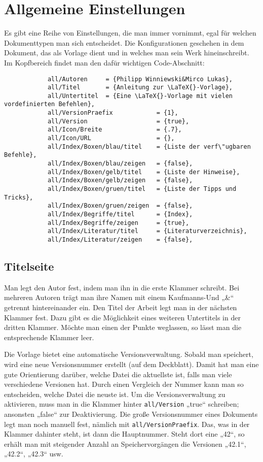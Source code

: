 		\section{Allgemeine Einstellungen}
		
			Es gibt eine Reihe von Einstellungen, die man immer vornimmt, egal für welchen Dokumenttypen man sich entscheidet. Die Konfigurationen geschehen in dem Dokument, das als Vorlage dient und in welches man sein Werk hineinschreibt. Im Kopfbereich findet man den dafür wichtigen Code-Abschnitt: 
			
			\begin{verbatim}
			all/Autoren     = {Philipp Winniewski&Mirco Lukas},
			all/Titel       = {Anleitung zur \LaTeX{}-Vorlage},
			all/Untertitel  = {Eine \LaTeX{}-Vorlage mit vielen vordefinierten Befehlen},
			all/VersionPraefix            = {1},
			all/Version                   = {true},
			all/Icon/Breite               = {.7},
			all/Icon/URL                  = {},
			all/Index/Boxen/blau/titel    = {Liste der verf\"ugbaren Befehle},
			all/Index/Boxen/blau/zeigen   = {false},
			all/Index/Boxen/gelb/titel    = {Liste der Hinweise},
			all/Index/Boxen/gelb/zeigen   = {false},
			all/Index/Boxen/gruen/titel   = {Liste der Tipps und Tricks},
			all/Index/Boxen/gruen/zeigen  = {false},
			all/Index/Begriffe/titel      = {Index},
			all/Index/Begriffe/zeigen     = {true},
			all/Index/Literatur/titel     = {Literaturverzeichnis},
			all/Index/Literatur/zeigen    = {false},
			\end{verbatim}
		
			\subsection{Titelseite}
			
				Man legt den Autor fest, indem man ihn in die erste Klammer schreibt. Bei mehreren Autoren trägt man ihre Namen mit einem Kaufmanns-Und „\&“ getrennt hintereinander ein. Den Titel der Arbeit legt man in der nächsten Klammer fest. Dazu gibt es die Möglichkeit eines weiteren Untertitels in der dritten Klammer. Möchte man einen der Punkte weglassen, so lässt man die entsprechende Klammer leer. 
				
				Die Vorlage bietet eine automatische Versionsverwaltung. Sobald man speichert, wird eine neue Versionsnummer erstellt (auf dem Deckblatt). Damit hat man eine gute Orientierung darüber, welche Datei die aktuellste ist, falls man viele verschiedene Versionen hat. Durch einen Vergleich der Nummer kann man so entscheiden, welche Datei die neuste ist. Um die Versionsverwaltung zu aktivieren, muss man in die Klammer hinter \texttt{all/Version} „true“ schreiben; ansonsten „false“ zur Deaktivierung. Die große Versionsnummer eines Dokuments legt man noch manuell fest, nämlich mit \texttt{all/VersionPraefix}. Das, was in der Klammer dahinter steht, ist dann die Hauptnummer. Steht dort eine „42“, so erhält man mit steigender Anzahl an Speichervorgängen die Versionen „42.1“, „42.2“, „42.3“ usw.
				
